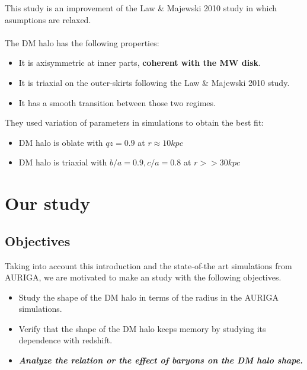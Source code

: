 \documentclass[xcolor=dvipsnames]{beamer}
\begin{document}

\begin{frame}

This study is an improvement of the Law \& Majewski 2010 study in which asumptions are relaxed.\\~\\

The DM halo has the following properties:

\begin{itemize}
\item It is axisymmetric at inner parts, \textbf{coherent with the MW disk}.

\item It is triaxial on the outer-skirts following the Law \& Majewski 2010 study.

\item It has a smooth transition between those two regimes.

\end{itemize}

They used variation of parameters in simulations to obtain the best fit:

\begin{itemize}
\item DM halo is oblate with $qz = 0.9$ at $r \approx 10kpc$

\item DM halo is triaxial with $b/a = 0.9, c/a = 0.8$ at $r>>30kpc$

\end{itemize}

\end{frame}

\section{Our study}
\subsection{Objectives}
\begin{frame}
Taking into account this introduction and the state-of-the art simulations from AURIGA, we are motivated to make an study with the following objectives.

\begin{itemize}
\item Study the shape of the DM halo in terms of the radius in the AURIGA simulations.

\item Verify that the shape of the DM halo keeps memory by studying its dependence with redshift.

\item \textbf{\textit{Analyze the relation or the effect of baryons on the DM halo shape.}}

\end{itemize}

\end{frame}
\end{document}
